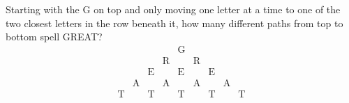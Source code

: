 Starting with the G on top and only moving one letter at a time to one of the two closest letters in the row beneath it, how many different paths from top to bottom spell GREAT?
\[
\begin{array}{ccccccccc}
 & & & & \mathrm{G} & & & & \\
 & & & \mathrm{R} & & \mathrm{R} & & & \\
 & & \mathrm{E} & & \mathrm{E} & & \mathrm{E} & & \\
 & \mathrm{A} & & \mathrm{A} & & \mathrm{A} & & \mathrm{A} & \\
\mathrm{T} & & \mathrm{T} & & \mathrm{T} & & \mathrm{T} & & \mathrm{T}
\end{array}
\]
